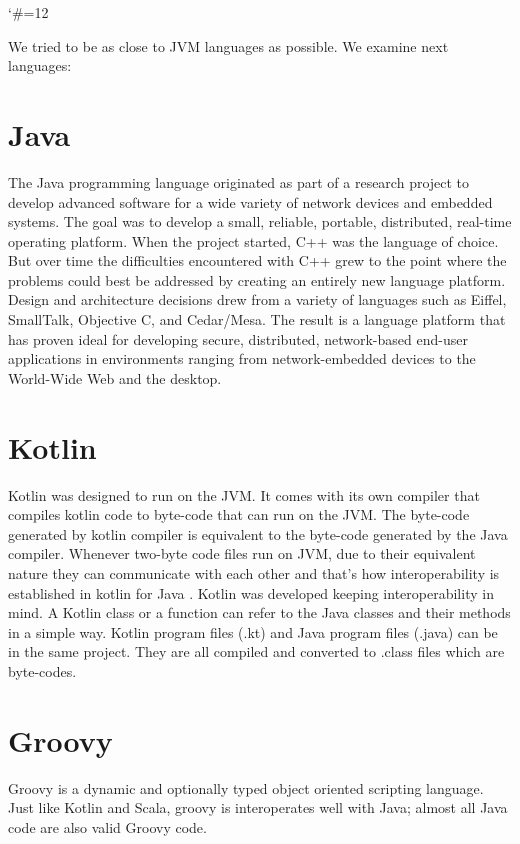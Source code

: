 \documentclass[12pt]{book}
\begin{document}
{{{\catcode`\#=12\relax
{}

We tried to be as close to JVM languages as possible.
We examine next languages:

\section{Java}
The Java programming language originated as part of a research project to develop advanced software for a wide variety of network devices and embedded systems. The goal was to develop a small, reliable, portable, distributed, real-time operating platform. When the project started, C++ was the language of choice. But over time the difficulties encountered with C++ grew to the point where the problems could best be addressed by creating an entirely new language platform. Design and architecture decisions drew from a variety of languages such as Eiffel, SmallTalk, Objective C, and Cedar/Mesa. The result is a language platform that has proven ideal for developing secure, distributed, network-based end-user applications in environments ranging from network-embedded devices to the World-Wide Web and the desktop.

\section{Kotlin}
Kotlin was designed to run on the JVM. It comes with its own compiler that compiles kotlin code to byte-code that can run on the JVM. The byte-code generated by kotlin compiler is equivalent to the byte-code generated by the Java compiler. Whenever two-byte code files run on JVM, due to their equivalent nature they can communicate with each other and that’s how interoperability is established in kotlin for Java . Kotlin was developed keeping interoperability in mind. A Kotlin class or a function can refer to the Java classes and their methods in a simple way. Kotlin program files (.kt) and Java program files (.java) can be in the same project. They are all compiled and converted to .class files which are byte-codes.

\section{Groovy}
Groovy is a dynamic and optionally typed object oriented scripting language. Just like Kotlin and Scala, groovy is interoperates well with Java; almost all Java code are also valid Groovy code.

}}}
\end{document}
